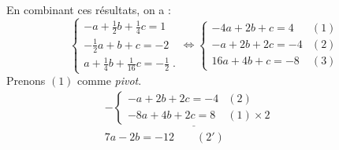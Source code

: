 \begin{valiny}
                              En combinant ces r\'esultats, on a :
                              \[
                                    \left\lbrace
                                          \begin{array}{lc}
                                                - a + \frac{1}{2} b + \frac{1}{4} c = 1            \\
                                                -\frac{1}{2} a + b + c = -2                        \\
                                                a + \frac{1}{4} b + \frac{1}{16} c = -\frac{1}{2}  \;.
                                          \end{array}
                                    \right.
                                    \iff
                                    \left\lbrace
                                          \begin{array}{lc}
                                                - 4 a + 2 b +   c =  4  & (1)    \\
                                                  - a + 2 b + 2 c = -4  & (2)    \\
                                                 16 a + 4 b +   c = -8  & (3)    
                                          \end{array}
                                    \right.
                              \]
                              Prenons $(1)$ comme \emph{pivot}.
                              \[
                                    \begin{matrix}
	                                       -
	                                    \underline{
		                                    \left\lbrace
		                                          \begin{array}{lc}
		                                                  - a + 2 b + 2 c = -4  & (2)    \\
		                                                - 8 a + 4 b + 2 c =  8  & (1)\times 2    
		                                          \end{array}
		                                    \right.
		                                    }
		                                    \\
		                              7 a - 2 b = -12 \qquad (2')
		                        \end{matrix}
                                    \qquad
                                    \begin{matrix}

\end{matrix}\]
\end{valiny}
